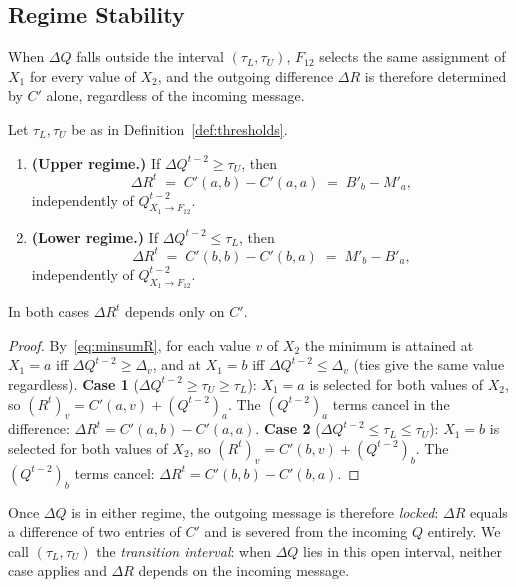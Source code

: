 \subsection{Regime Stability}\label{sec:regimes}
When $\Delta Q$ falls outside the interval $(\tau_L, \tau_U)$, $F_{12}$ selects the same assignment of $X_1$ for every value of $X_2$, and the outgoing difference $\Delta R$ is therefore determined by $C'$ alone, regardless of the incoming message.
\begin{theorem}\label{thm:stability}
Let $\tau_L, \tau_U$ be as in Definition~\ref{def:thresholds}.
\begin{enumerate}
    \item \textbf{(Upper regime.)} If $\Delta Q^{t-2} \geq \tau_U$, then
    \[
        \Delta R^t \;=\; C'(a,b) - C'(a,a) \;=\; B'_b - M'_a,
    \]
    independently of $Q^{t-2}_{X_1 \to F_{12}}$.
    \item \textbf{(Lower regime.)} If $\Delta Q^{t-2} \leq \tau_L$, then
    \[
        \Delta R^t \;=\; C'(b,b) - C'(b,a) \;=\; M'_b - B'_a,
    \]
    independently of $Q^{t-2}_{X_1 \to F_{12}}$.
\end{enumerate}
In both cases $\Delta R^t$ depends only on $C'$.
\end{theorem}
\begin{proof}
By~\eqref{eq:minsumR}, for each value $v$ of $X_2$ the minimum is attained at $X_1=a$ iff $\Delta Q^{t-2} \geq \Delta_v$, and at $X_1=b$ iff $\Delta Q^{t-2} \leq \Delta_v$ (ties give the same value regardless).
\smallskip\noindent\textbf{Case 1} ($\Delta Q^{t-2} \geq \tau_U \geq \tau_L$):  $X_1=a$ is selected for both values of $X_2$, so $(R^t)_v = C'(a,v) + (Q^{t-2})_a$.  The $(Q^{t-2})_a$ terms cancel in the difference: $\Delta R^t = C'(a,b)-C'(a,a)$.
\smallskip\noindent\textbf{Case 2} ($\Delta Q^{t-2} \leq \tau_L \leq \tau_U$):  $X_1=b$ is selected for both values of $X_2$, so $(R^t)_v = C'(b,v) + (Q^{t-2})_b$.  The $(Q^{t-2})_b$ terms cancel: $\Delta R^t = C'(b,b)-C'(b,a)$. \qedhere
\end{proof}
Once $\Delta Q$ is in either regime, the outgoing message is therefore \emph{locked}: $\Delta R$ equals a difference of two entries of $C'$ and is severed from the incoming $Q$ entirely.  We call $(\tau_L, \tau_U)$ the \emph{transition interval}: when $\Delta Q$ lies in this open interval, neither case applies and $\Delta R$ depends on the incoming message.
